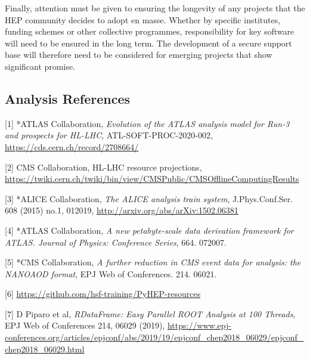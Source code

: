 \documentclass[11pt,a4paper]{article}
\begin{document}
Finally, attention must be given to ensuring the longevity of any
projects that the HEP community decides to adopt en masse. Whether by
specific institutes, funding schemes or other collective programmes,
responsibility for key software will need to be ensured in the long
term. The development of a secure support base will therefore need to be
considered for emerging projects that show significant promise.

\subsection{Analysis References}\label{references-2}


{[}1{]} *ATLAS Collaboration, \emph{Evolution of the ATLAS analysis
model for Run-3 and prospects for HL-LHC}, ATL-SOFT-PROC-2020-002,
\href{https://cds.cern.ch/record/2708664/}{{https://cds.cern.ch/record/2708664/}}

{[}2{]} CMS Collaboration, HL-LHC resource projections,
\href{https://twiki.cern.ch/twiki/bin/view/CMSPublic/CMSOfflineComputingResults}{{https://twiki.cern.ch/twiki/bin/view/CMSPublic/CMSOfflineComputingResults}}

{[}3{]} *ALICE Collaboration, \emph{The ALICE analysis train system},
J.Phys.Conf.Ser. 608 (2015) no.1, 012019,
\href{http://arxiv.org/abs/arXiv:1502.06381}{{http://arxiv.org/abs/arXiv:1502.06381}}

{[}4{]} *ATLAS Collaboration, \emph{A new petabyte-scale data derivation
framework for ATLAS. Journal of Physics: Conference Series}, 664.
072007.

{[}5{]} *CMS Collaboration, \emph{A further reduction in CMS event data
for analysis: the NANOAOD format}, EPJ Web of Conferences. 214. 06021.

{[}6{]}
\href{https://github.com/hsf-training/PyHEP-resources}{{https://github.com/hsf-training/PyHEP-resources}}

{[}7{]} D Piparo et al, \emph{RDataFrame: Easy Parallel ROOT Analysis at
100 Threads}, EPJ Web of Conferences 214, 06029 (2019),
\href{https://www.epj-conferences.org/articles/epjconf/abs/2019/19/epjconf_chep2018_06029/epjconf_chep2018_06029.html}{{https://www.epj-conferences.org/articles/epjconf/abs/2019/19/epjconf\_chep2018\_06029/epjconf\_chep2018\_06029.html}}
\end{document}
